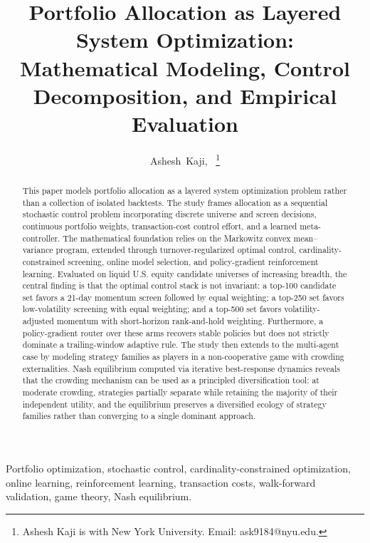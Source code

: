 \documentclass[journal,10pt]{IEEEtran}
\title{Portfolio Allocation as Layered System Optimization: Mathematical Modeling, Control Decomposition, and Empirical Evaluation}
\author{Ashesh~Kaji,~\IEEEmembership{Student,~New~York~University}%
\thanks{Ashesh Kaji is with New York University. Email: ask9184@nyu.edu.}}
\begin{document}
\maketitle
\begin{abstract}
This paper models portfolio allocation as a layered system optimization problem rather than a collection of isolated backtests. The study frames allocation as a sequential stochastic control problem incorporating discrete universe and screen decisions, continuous portfolio weights, transaction-cost control effort, and a learned meta-controller. The mathematical foundation relies on the Markowitz convex mean--variance program, extended through turnover-regularized optimal control, cardinality-constrained screening, online model selection, and policy-gradient reinforcement learning. Evaluated on liquid U.S. equity candidate universes of increasing breadth, the central finding is that the optimal control stack is not invariant: a top-100 candidate set favors a 21-day momentum screen followed by equal weighting; a top-250 set favors low-volatility screening with equal weighting; and a top-500 set favors volatility-adjusted momentum with short-horizon rank-and-hold weighting. Furthermore, a policy-gradient router over these arms recovers stable policies but does not strictly dominate a trailing-window adaptive rule. The study then extends to the multi-agent case by modeling strategy families as players in a non-cooperative game with crowding externalities. Nash equilibrium computed via iterative best-response dynamics reveals that the crowding mechanism can be used as a principled diversification tool: at moderate crowding, strategies partially separate while retaining the majority of their independent utility, and the equilibrium preserves a diversified ecology of strategy families rather than converging to a single dominant approach.
\end{abstract}
\begin{IEEEkeywords}
Portfolio optimization, stochastic control, cardinality-constrained optimization, online learning, reinforcement learning, transaction costs, walk-forward validation, game theory, Nash equilibrium.
\end{IEEEkeywords}
\end{document}
